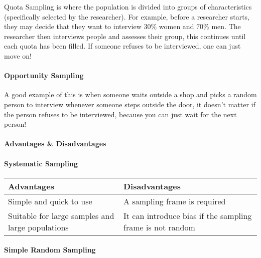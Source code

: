 \documentclass[
]{article}
\begin{document}
Quota Sampling is where the population is divided into groups of
characteristics (specifically selected by the researcher). For example,
before a researcher starts, they may decide that they want to interview
\(30\%\) women and \(70\%\) men. The researcher then interviews people
and assesses their group, this continues until each quota has been
filled. If someone refuses to be interviewed, one can just move on!

\hypertarget{opportunity-sampling}{%
\paragraph{Opportunity Sampling}\label{opportunity-sampling}}

A good example of this is when someone waits outside a shop and picks a
random person to interview whenever someone steps outside the door, it
doesn't matter if the person refuses to be interviewed, because you can
just wait for the next person!

\hypertarget{advantages-disadvantages}{%
\paragraph{Advantages \& Disadvantages}\label{advantages-disadvantages}}

\hypertarget{systematic-sampling-1}{%
\paragraph{Systematic Sampling}\label{systematic-sampling-1}}

\begin{longtable}[]{@{}
  >{\raggedright\arraybackslash}p{}
  >{\raggedright\arraybackslash}p{}@{}}
\toprule
Advantages & Disadvantages \\
\midrule
\endhead
Simple and quick to use & A sampling frame is required \\
Suitable for large samples and large populations & It can introduce bias
if the sampling frame is not random \\
\bottomrule
\end{longtable}

\hypertarget{simple-random-sampling-1}{%
\paragraph{Simple Random Sampling}\label{simple-random-sampling-1}}
\end{document}
